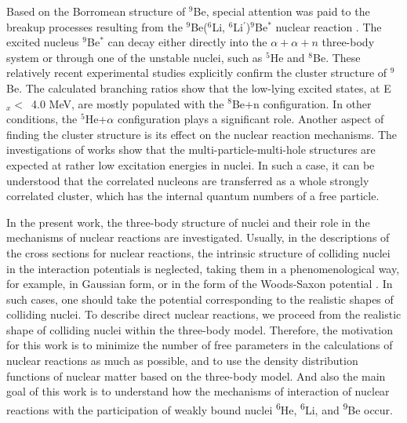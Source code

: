 \documentclass[
12pt, %
oneside, %
english, %
doublespacing, %
doublespacing, %
toctotoc, %
parskip, %
headsepline, %
]{MastersDoctoralThesis} %
\newcommand{\he}{\textsuperscript{6}He\xspace}
\newcommand{\li}{\textsuperscript{6}Li\xspace}
\newcommand{\be}{\textsuperscript{9}Be\xspace}
\begin{document}
Based on the Borromean structure of ${}^9$Be, special attention was paid to the breakup processes resulting from the ${}^9$Be($^6$Li, ${}^6$Li$^\prime$)$^9$Be$^*$ nuclear reaction \cite{brown2007, papka2007}. The excited nucleus ${}^9$Be$^*$ can decay either directly into the $\alpha+\alpha+n$ three-body system or through one of the unstable nuclei, such as ${}^5$He and ${}^8$Be. These relatively recent experimental studies explicitly confirm the cluster structure of ${}^9$Be.
The calculated branching ratios show that the low-lying excited states, at E$_x <$~4.0 MeV, are mostly populated with the ${}^8$Be+n configuration. In other conditions, the ${}^5$He+$\alpha$ configuration plays a significant  role.
Another aspect of finding the cluster structure is its  effect on the nuclear reaction mechanisms. The investigations of works \cite{detraz1970, detraz1974} show that the multi-particle-multi-hole structures are expected at rather low excitation energies in nuclei. In such a case, it can be understood that the correlated nucleons are transferred as a whole strongly correlated cluster, which has the internal quantum numbers of a free particle.

In the present work, the three-body structure of nuclei and their role in the mechanisms of nuclear reactions are investigated.
 Usually, in the descriptions of the cross sections for nuclear reactions, the intrinsic structure of colliding nuclei in the interaction potentials is neglected, taking them in a phenomenological way, 
 for example, in Gaussian form, or in the form of the Woods-Saxon potential \cite{oganessian1999dynamics}.
 In such cases, one should take the potential corresponding to the realistic shapes of colliding nuclei.
 To describe direct nuclear reactions, we proceed from the realistic shape of colliding nuclei within the three-body model.
 Therefore, the motivation for this work is to minimize the number of free parameters in the calculations of nuclear reactions as much as possible, and to use the density distribution functions of nuclear matter based on the three-body model. And also the main goal of this work is to understand how the mechanisms of interaction of nuclear reactions with the participation of weakly bound nuclei \he, \li, and \be occur. 
\end{document}
